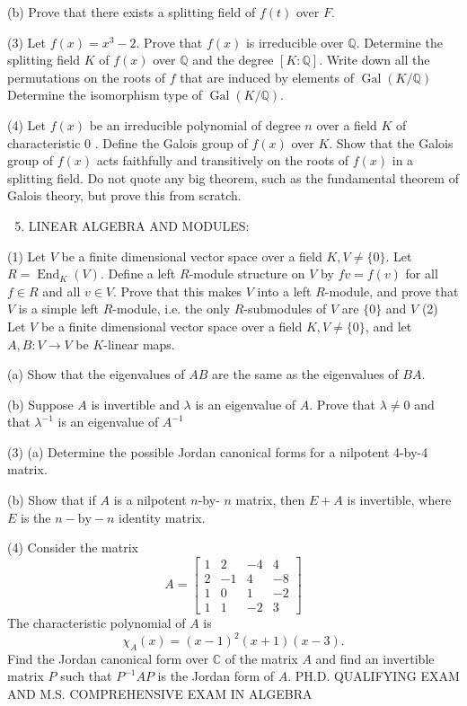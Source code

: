 \documentclass[10pt]{article}
\begin{document}
(b) Prove that there exists a splitting field of $f(t)$ over $F$.

(3) Let $f(x)=x^{3}-2$. Prove that $f(x)$ is irreducible over $\mathbb{Q}$. Determine the splitting field $K$ of $f(x)$ over $\mathbb{Q}$ and the degree $[K: \mathbb{Q}]$. Write down all the permutations on the roots of $f$ that are induced by elements of $\operatorname{Gal}(K / \mathbb{Q})$ Determine the isomorphism type of $\operatorname{Gal}(K / \mathbb{Q})$.

(4) Let $f(x)$ be an irreducible polynomial of degree $n$ over a field $K$ of characteristic 0 . Define the Galois group of $f(x)$ over $K$. Show that the Galois group of $f(x)$ acts faithfully and transitively on the roots of $f(x)$ in a splitting field. Do not quote any big theorem, such as the fundamental theorem of Galois theory, but prove this from scratch.

\begin{enumerate}
  \setcounter{enumi}{4}
  \item LINEAR ALGEBRA AND MODULES:
\end{enumerate}
(1) Let $V$ be a finite dimensional vector space over a field $K, V \neq\{0\}$. Let $R=\operatorname{End}_{K}(V)$. Define a left $R$-module structure on $V$ by $f v=f(v)$ for all $f \in R$ and all $v \in V$. Prove that this makes $V$ into a left $R$-module, and prove that $V$ is a simple left $R$-module, i.e. the only $R$-submodules of $V$ are $\{0\}$ and $V$ (2) Let $V$ be a finite dimensional vector space over a field $K, V \neq\{0\}$, and let $A, B: V \rightarrow V$ be $K$-linear maps.

(a) Show that the eigenvalues of $A B$ are the same as the eigenvalues of $B A$.

(b) Suppose $A$ is invertible and $\lambda$ is an eigenvalue of $A$. Prove that $\lambda \neq 0$ and that $\lambda^{-1}$ is an eigenvalue of $A^{-1}$

(3) (a) Determine the possible Jordan canonical forms for a nilpotent 4-by-4 matrix.

(b) Show that if $A$ is a nilpotent $n$-by- $n$ matrix, then $E+A$ is invertible, where $E$ is the $n-\mathrm{by}-n$ identity matrix.

(4) Consider the matrix
$$
A=\left[\begin{array}{rrrr}
1 & 2 & -4 & 4 \\
2 & -1 & 4 & -8 \\
1 & 0 & 1 & -2 \\
1 & 1 & -2 & 3
\end{array}\right]
$$
The characteristic polynomial of $A$ is
$$
\chi_{A}(x)=(x-1)^{2}(x+1)(x-3) .
$$
Find the Jordan canonical form over $\mathbb{C}$ of the matrix $A$ and find an invertible matrix $P$ such that $P^{-1} A P$ is the Jordan form of $A$. PH.D. QUALIFYING EXAM AND M.S. COMPREHENSIVE EXAM IN ALGEBRA
\end{document}
